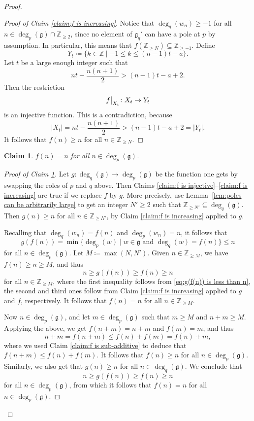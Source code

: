 \documentclass[10pt,a4paper]{amsart}
\newtheorem{claim}{Claim}
\def\ZZ{\mathbb{Z}}
\def\g{\mathfrak{g}}
\newcommand\restr[2]{{\left.\kern-\nulldelimiterspace #1 \vphantom{\big|} \right|_{#2}}}
\begin{document}
\begin{proof}
\begin{proof}[Proof of Claim \ref{claim:f is increasing}]
        Notice that $\deg_q(w_n) \geq -1$ for all $n \in \deg_p(\g) \cap \ZZ_{\geq 2}$, since no element of $\g_q'$ can have a pole at $p$ by assumption. In particular, this means that $f(\ZZ_{\geq N}) \subseteq \ZZ_{\geq -1}$. Define
        $$Y_t \coloneqq \{k \in \ZZ \mid -1 \leq k \leq (n - 1)t - a\}.$$
        Let $t$ be a large enough integer such that
        $$nt - \frac{n(n + 1)}{2} > (n - 1)t - a + 2.$$
        Then the restriction
        $$\restr{f}{X_t} \colon X_t \to Y_t$$
        is an injective function. This is a contradiction, because
        $$|X_t| = nt - \frac{n(n + 1)}{2} > (n - 1)t - a + 2 = |Y_t|.$$
        It follows that $f(n) \geq n$ for all $n \in \ZZ_{\geq N}$.
    \end{proof}

    \begin{claim}\label{claim:f is the identity}
        $f(n) = n$ for all $n \in \deg_p(\g)$.
    \end{claim}
    \begin{proof}[Proof of Claim \ref{claim:f is the identity}]
        Let $g \colon \deg_q(\g) \to \deg_p(\g)$ be the function one gets by swapping the roles of $p$ and $q$ above. Then Claims \ref{claim:f is injective}--\ref{claim:f is increasing} are true if we replace $f$ by $g$. More precisely, use Lemma~\ref{lem:poles can be arbitrarily large} to get an integer $N' \geq 2$ such that $\ZZ_{\geq N'} \subseteq \deg_q(\g)$. Then $g(n) \geq n$ for all $n \in \ZZ_{\geq N'}$, by Claim \ref{claim:f is increasing} applied to $g$.

        Recalling that $\deg_q(w_n) = f(n)$ and $\deg_p(w_n) = n$, it follows that
        \begin{equation}\label{eq:g(f(n)) is less than n}
            g(f(n)) = \min\{\deg_p(w) \mid w \in \g \text{ and } \deg_q(w) = f(n)\} \leq n
        \end{equation}
        for all $n \in \deg_p(\g)$. Let $M \coloneqq \max(N,N')$. Given $n \in \ZZ_{\geq M}$, we have $f(n) \geq n \geq M$, and thus
        $$n \geq g(f(n)) \geq f(n) \geq n$$
        for all $n \in \ZZ_{\geq M}$, where the first inequality follows from \eqref{eq:g(f(n)) is less than n}, the second and third ones follow from Claim \ref{claim:f is increasing} applied to $g$ and $f$, respectively. It follows that $f(n) = n$ for all $n \in \ZZ_{\geq M}$.

        Now $n \in \deg_p(\g)$, and let $m \in \deg_p(\g)$ such that $m \geq M$ and $n + m \geq M$. Applying the above, we get $f(n + m) = n + m$ and $f(m) = m$, and thus
        $$n + m = f(n + m) \leq f(n) + f(m) = f(n) + m,$$
        where we used Claim \ref{claim:f is sub-additive} to deduce that $f(n + m) \leq f(n) + f(m)$. It follows that $f(n) \geq n$ for all $n \in \deg_p(\g)$. Similarly, we also get that $g(n) \geq n$ for all $n \in \deg_q(\g)$. We conclude that
        $$n \geq g(f(n)) \geq f(n) \geq n$$
        for all $n \in \deg_p(\g)$, from which it follows that $f(n) = n$ for all $n \in \deg_p(\g)$.
    \end{proof}


\end{proof}
\end{document}
